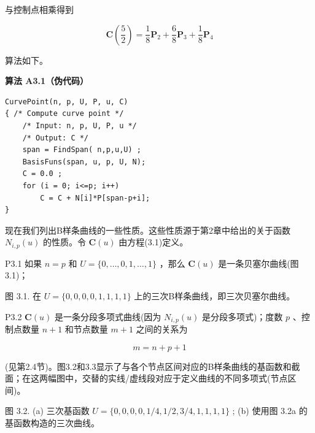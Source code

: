 \documentclass[../main.tex]{subfiles}
\begin{document}
与控制点相乘得到

\[
\mathbf{C}\left( \frac{5}{2}\right)  = \frac{1}{8}{\mathbf{P}}_{2} + \frac{6}{8}{\mathbf{P}}_{3} + \frac{1}{8}{\mathbf{P}}_{4}
\]

算法如下。

\par\medskip\noindent\textbf{算法 A3.1（伪代码）}\par
\begin{verbatim}
CurvePoint(n, p, U, P, u, C)
{ /* Compute curve point */
    /* Input: n, p, U, P, u */
    /* Output: C */
    span = FindSpan( n,p,u,U) ;
    BasisFuns(span, u, p, U, N);
    C = 0.0 ;
    for (i = 0; i<=p; i++)
        C = C + N[i]*P[span-p+i];
}
\end{verbatim}

现在我们列出B样条曲线的一些性质。这些性质源于第2章中给出的关于函数 \({N}_{i,p}\left( u\right)\) 的性质。令 \(\mathbf{C}\left( u\right)\) 由方程(3.1)定义。

P3.1 如果 \(n = p\) 和 \(U = \{ 0,\ldots ,0,1,\ldots ,1\}\) ，那么 \(\mathbf{C}\left( u\right)\) 是一条贝塞尔曲线(图3.1)；

\begin{center}
\begin{minipage}{14cm}
\vspace*{.6\baselineskip}
\centering
{}
\par\smallskip
图 3.1. 在 \(U = \{ 0,0,0,0,1,1,1,1\}\) 上的三次B样条曲线，即三次贝塞尔曲线。
\end{minipage}
\end{center}

P3.2 \(\mathbf{C}\left( u\right)\) 是一条分段多项式曲线(因为 \({N}_{i,p}\left( u\right)\) 是分段多项式)；度数 \(p\) 、控制点数量 \(n + 1\) 和节点数量 \(m + 1\) 之间的关系为

\[
m = n + p + 1 \tag{3.2}
\]



(见第2.4节)。图3.2和3.3显示了与各个节点区间对应的B样条曲线的基函数和截面；在这两幅图中，交替的实线/虚线段对应于定义曲线的不同多项式(节点区间)。

\begin{center}
\begin{minipage}{18cm}
\vspace*{.6\baselineskip}
\centering
{}
\par\smallskip
图 3.2. (a) 三次基函数 \(U = \{ 0,0,0,0,1/4,1/2,3/4,1,1,1,1\}\) ; (b) 使用图 3.2a 的基函数构造的三次曲线。
\end{minipage}
\end{center}
\end{document}
